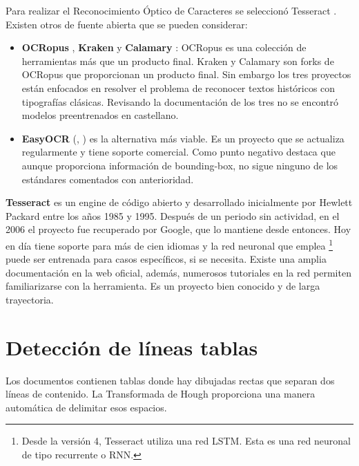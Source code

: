 Para realizar el Reconocimiento Óptico de Caracteres se seleccionó Tesseract \cite{ocr_tesseract_raysmithetal.TesseractocrTesseract2021}. Existen otros de fuente abierta que se pueden considerar:

\begin{itemize}
    \item \textbf{OCRopus} \cite{ocr_ocropus_ocropy_project}, \textbf{Kraken}  y \textbf{Calamary} \cite{ocr_calamari_journal}: OCRopus es una colección de herramientas más que un producto final. Kraken y Calamary son forks de OCRopus que proporcionan un producto final. Sin embargo los tres proyectos están enfocados en resolver el problema de reconocer textos históricos con tipografías clásicas. Revisando la documentación de los tres no se encontró modelos preentrenados en castellano.
    \item \textbf{EasyOCR} (\cite{ocr_easyocr_official}, \cite{ocr_easyocr_project}) es la alternativa más viable. Es un proyecto que se actualiza regularmente y tiene soporte comercial. Como punto negativo destaca que aunque proporciona información de bounding-box, no sigue ninguno de los estándares comentados con anterioridad.
\end{itemize}

\textbf{Tesseract} \cite{ocr_tesseract_smith_paper} es un engine de código abierto y desarrollado inicialmente por Hewlett Packard \cite{ocr_tesseract_v4_release_notes} entre los años 1985 y 1995. Después de un periodo sin actividad, en el 2006 el proyecto fue recuperado por Google, que lo mantiene desde entonces. Hoy en día tiene soporte para más de cien idiomas y la red neuronal que emplea \footnote{Desde la versión 4, Tesseract utiliza una red LSTM. Esta es una red neuronal de tipo recurrente o RNN.} puede ser entrenada para casos específicos, si se necesita. Existe una amplia documentación en la web oficial, además, numerosos tutoriales en la red permiten familiarizarse con la herramienta. Es un proyecto bien conocido y de larga trayectoria.

\section{Detección de líneas tablas}


Los documentos contienen tablas donde hay dibujadas rectas que separan dos líneas de contenido. La Transformada de Hough proporciona una manera automática de delimitar esos espacios.

